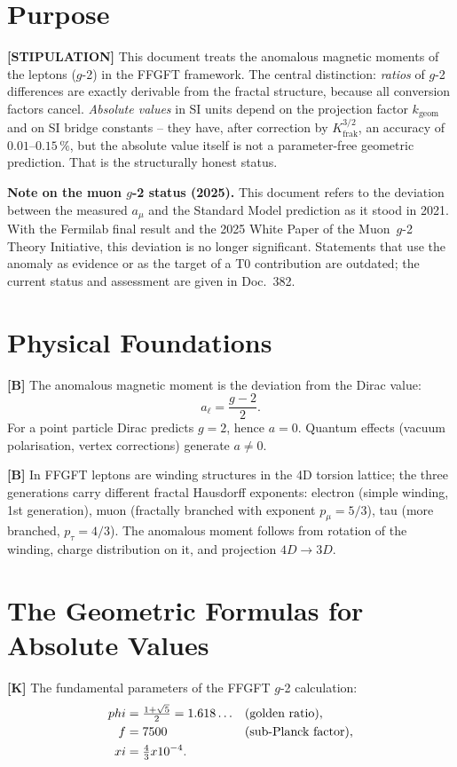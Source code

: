 \section{Purpose}


\textbf{[STIPULATION]} This document treats the anomalous magnetic moments of the
leptons ($g$-2) in the FFGFT framework. The central distinction: \emph{ratios} of
$g$-2 differences are exactly derivable from the fractal structure, because all
conversion factors cancel. \emph{Absolute values} in SI units depend on the
projection factor $k_\text{geom}$ and on SI bridge constants -- they have, after
correction by $K_\text{frak}^{3/2}$, an accuracy of $0{.}01$--$0{.}15\,\%$, but
the absolute value itself is not a parameter-free geometric prediction. That is
the structurally honest status.

	\medskip\noindent\textbf{Note on the muon $g$-2 status (2025).} This document refers to the deviation between the measured $a_\mu$ and the Standard Model prediction as it stood in 2021. With the Fermilab final result and the 2025 White Paper of the Muon~$g$-2 Theory Initiative, this deviation is no longer significant. Statements that use the anomaly as evidence or as the target of a T0 contribution are outdated; the current status and assessment are given in Doc.~382.


\section{Physical Foundations}

\textbf{[B]} The anomalous magnetic moment is the deviation from the Dirac value:
\[
  a_\ell = \frac{g-2}{2}.
\]
For a point particle Dirac predicts $g=2$, hence $a=0$. Quantum effects (vacuum
polarisation, vertex corrections) generate $a\neq0$.

\textbf{[B]} In FFGFT leptons are winding structures in the 4D torsion lattice;
the three generations carry different fractal Hausdorff exponents: electron (simple
winding, 1st generation), muon (fractally branched with exponent $p_\mu=5/3$),
tau (more branched, $p_\tau=4/3$). The anomalous moment follows from rotation of
the winding, charge distribution on it, and projection $4D\to3D$.

\section{The Geometric Formulas for Absolute Values}

\textbf{[K]} The fundamental parameters of the FFGFT $g$-2 calculation:
\begin{align}
  \varphi &= \tfrac{1+\sqrt5}{2} = 1{.}618\ldots &&(\text{golden ratio}), \notag\\
  f       &= 7500 &&(\text{sub-Planck factor}), \notag\\
  \xi     &= \tfrac43\times10^{-4}. \notag
\end{align}

